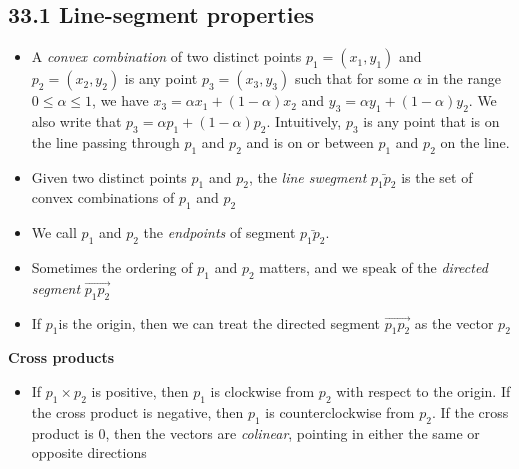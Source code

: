\documentclass{report}
\begin{document}
\subsection*{33.1 Line-segment properties}
\begin{itemize}
    \item A \textit{convex combination} of two distinct points $p_1 = (x_1, y_1)$ and $p_2 = (x_2, y_2)$ is any point $p_3 = (x_3, y_3)$ such that for some $\alpha$ in the range $0 \leq \alpha \leq 1$, we have $x_3 = \alpha x_1 + (1 - \alpha)x_2$ and $y_3 = \alpha y_1 + (1 - \alpha) y_2$. We also write that $p_3 = \alpha p_1 + (1 - \alpha) p_2$. Intuitively, $p_3$ is any point that is on the line passing through $p_1$ and $p_2$ and is on or between $p_1$ and $p_2$ on the line.
    \item Given two distinct points $p_1$ and $p_2$, the \textit{line swegment} $\bar{p_1p_2}$ is the set of convex combinations of $p_1$ and $p_2$
    \item We call $p_1$ and $p_2$ the \textit{endpoints} of segment $\bar{p_1p_2}$.
    \item Sometimes the ordering of $p_1$ and $p_2$ matters, and we speak of the \textit{directed segment} $\overrightarrow{p_1p_2}$
    \item If $p_1$is the origin, then we can treat the directed segment $\overrightarrow{p_1p_2}$ as the vector $p_2$
\end{itemize}
\textbf{Cross products}
\begin{itemize}
    \item If $p_1 \times p_2$ is positive, then $p_1$ is clockwise from $p_2$ with respect to the origin. If the cross product is negative, then $p_1$ is counterclockwise from $p_2$. If the cross product is 0, then the vectors are \textit{colinear}, pointing in either the same or opposite directions
\end{itemize}
\end{document}
